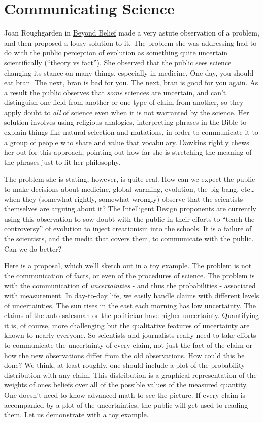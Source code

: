 \section{Communicating Science}

Joan Roughgarden in
\href{http://thesciencenetwork.org/programs/beyond-belief-science-religion-reason-and-survival}{Beyond
Belief} made a very astute observation of a problem, and then proposed a
lousy solution to it. The problem she was addressing had to do with the
public perception of evolution as something quite uncertain
scientifically (``theory vs fact''). She observed that the public sees
science changing its stance on many things, especially in medicine. One
day, you should eat bran. The next, bran is bad for you. The next, bran
is good for you again. As a result the public observes that \emph{some}
sciences are uncertain, and can't distinguish one field from another or
one type of claim from another, so they apply doubt to \emph{all} of
science even when it is not warranted by the science. Her solution
involves using religious analogies, interpreting phrases in the Bible to
explain things like natural selection and mutations, in order to
communicate it to a group of people who share and value that vocabulary.
Dawkins rightly chews her out for this approach, pointing out how far
she is stretching the meaning of the phrases just to fit her philosophy.

The problem she is stating, however, is quite real. How can we expect
the public to make decisions about medicine, global warming, evolution,
the big bang, etc\ldots{} when they (somewhat rightly, somewhat wrongly)
observe that the scientists themselves are arguing about it? The
Intelligent Design proponents are currently using this observation to sow
doubt with the public in their efforts to ``teach the controversy'' of
evolution to inject creationism into the schools. It is a failure of the
scientists, and the media that covers them, to communicate with the
public. Can we do better?

Here is a proposal, which we'll sketch out in a toy example. The problem
is not the communication of facts, or even of the procedures of science.
The problem is with the communication of \emph{uncertainties} - and thus the probabilities - associated with measurement. In day-to-day life, we easily handle claims with different levels of
uncertainties. The sun rises in the east each morning has low
uncertainty. The claims of the auto salesman or the politician have
higher uncertainty. Quantifying it is, of course, more challenging but
the qualitative features of uncertainty are known to nearly everyone. So
scientists and journalists really need to take efforts to communicate
the uncertainty of every claim, not just the fact of the claim or how
the new observations differ from the old observations. How could this be
done?  We think, at least roughly, one should include a plot of the
probability distribution with any claim. This distribution is a graphical representation of the weights of ones beliefs over all of the possible values of the measured quantity.  One doesn't need to know
advanced math to see the picture. If every claim is accompanied by a
plot of the uncertainties, the public will get used to reading them. Let
us demonstrate with a toy example.

